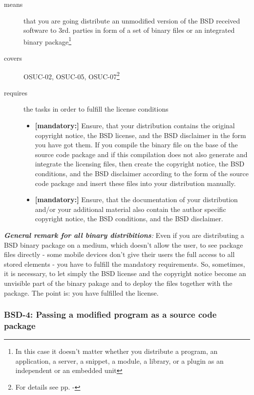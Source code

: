 \begin{description}
\item[means] that you are going distribute an unmodified version of the BSD
received software to 3rd. parties in form of a set of binary files or an
integrated bi\-na\-ry package\footnote{In this case it doesn't matter whether
you distribute a program, an application, a server, a snippet, a module, a library,
or a plugin as an independent or an embedded unit}
\item[covers] OSUC-02, OSUC-05, OSUC-07\footnote{For details see pp.
\pageref{OSUC-02-DEF} - \pageref{OSUC-07-DEF}}
\item[requires] the tasks in order to fulfill the license conditions
\begin{itemize}
  \item  \textbf{[mandatory:]} Ensure, that your distribution contains the
  original copyright notice, the BSD license, and the BSD disclaimer in the form
  you have got them. If you compile the binary file on the base of the source
  code package and if this compilation does not also generate and integrate the
  licensing files, then create the copyright notice, the BSD conditions, and the
  BSD disclaimer according to the form of the source code package and insert
  these files into your distribution manually.
  \item  \textbf{[mandatory:]} Ensure, that the documentation of your
  distribution and/or your additional material also contain the author specific
  copyright notice, the BSD conditions, and the BSD disclaimer.
\end{itemize}
\end{description}

\begin{itshape}
\emph{\textbf{General remark for all binary distribitions}:} 
\label{MobileDeviceHint} Even if you are distributing a BSD bi\-na\-ry package
on a medium, which doesn't allow the user, to see package files directly - some
mobile devices don't give their users the full access to all stored elements -
you have to fulfill the mandatory requirements. So, sometimes, it is necessary,
to let simply the BSD license and the copyright notice become an unvisible part
of the binary pakage and to deploy the files together with the package. The
point is: you have fulfilled the license.
\end{itshape}

\subsubsection{BSD-4: Passing a modified program as a source code package}
\label{OSUC-04-BSD}

